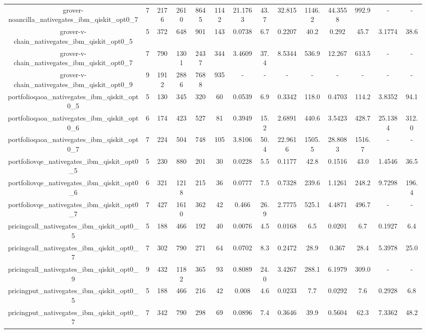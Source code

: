 \begin{table}[htb]
{\begin{tabular}{|c|c|c|c|c|c|c|c|c|c|c|c|c|c|}
grover-noancilla\_nativegates\_ibm\_qiskit\_opt0\_7 & 7 & 2176 & 2610 & 8645 & 1142 & 21.1763 & 43.7 & 32.815 & 1146.2 & 44.3558 & 992.9 & - & - \\ 
grover-v-chain\_nativegates\_ibm\_qiskit\_opt0\_5 & 5 & 372 & 648 & 901 & 143 & 0.0738 & 6.7 & 0.2207 & 40.2 & 0.292 & 45.7 & 3.1774 & 38.6 \\ 
grover-v-chain\_nativegates\_ibm\_qiskit\_opt0\_7 & 7 & 790 & 1301 & 2437 & 344 & 3.4609 & 37.4 & 8.5344 & 536.9 & 12.267 & 613.5 & - & - \\ 
grover-v-chain\_nativegates\_ibm\_qiskit\_opt0\_9 & 9 & 1912 & 2886 & 7688 & 935 & - & - & - & - & - & - & - & - \\ 
portfolioqaoa\_nativegates\_ibm\_qiskit\_opt0\_5 & 5 & 130 & 345 & 320 & 60 & 0.0539 & 6.9 & 0.3342 & 118.0 & 0.4703 & 114.2 & 3.8352 & 94.1 \\ 
portfolioqaoa\_nativegates\_ibm\_qiskit\_opt0\_6 & 6 & 174 & 423 & 527 & 81 & 0.3949 & 15.2 & 2.6891 & 440.6 & 3.5423 & 428.7 & 25.1384 & 312.0 \\ 
portfolioqaoa\_nativegates\_ibm\_qiskit\_opt0\_7 & 7 & 224 & 504 & 748 & 105 & 3.8106 & 50.4 & 22.9616 & 1505.5 & 28.8083 & 1516.7 & - & - \\ 
portfoliovqe\_nativegates\_ibm\_qiskit\_opt0\_5 & 5 & 230 & 880 & 201 & 30 & 0.0228 & 5.5 & 0.1177 & 42.8 & 0.1516 & 43.0 & 1.4546 & 36.5 \\ 
portfoliovqe\_nativegates\_ibm\_qiskit\_opt0\_6 & 6 & 321 & 1218 & 215 & 36 & 0.0777 & 7.5 & 0.7328 & 239.6 & 1.1261 & 248.2 & 9.7298 & 196.4 \\ 
portfoliovqe\_nativegates\_ibm\_qiskit\_opt0\_7 & 7 & 427 & 1610 & 362 & 42 & 0.466 & 26.9 & 2.7775 & 525.1 & 4.4871 & 496.7 & - & - \\ 
pricingcall\_nativegates\_ibm\_qiskit\_opt0\_5 & 5 & 188 & 466 & 192 & 40 & 0.0076 & 4.5 & 0.0168 & 6.5 & 0.0201 & 6.7 & 0.1927 & 6.4 \\ 
pricingcall\_nativegates\_ibm\_qiskit\_opt0\_7 & 7 & 302 & 790 & 271 & 64 & 0.0702 & 8.3 & 0.2472 & 28.9 & 0.367 & 28.4 & 5.3978 & 25.0 \\ 
pricingcall\_nativegates\_ibm\_qiskit\_opt0\_9 & 9 & 432 & 1182 & 365 & 93 & 0.8089 & 24.0 & 3.4267 & 288.1 & 6.1979 & 309.0 & - & - \\ 
pricingput\_nativegates\_ibm\_qiskit\_opt0\_5 & 5 & 188 & 466 & 216 & 42 & 0.008 & 4.6 & 0.0233 & 7.7 & 0.0292 & 7.6 & 0.2928 & 6.8 \\ 
pricingput\_nativegates\_ibm\_qiskit\_opt0\_7 & 7 & 342 & 790 & 298 & 69 & 0.0896 & 7.4 & 0.3646 & 39.9 & 0.5604 & 62.3 & 7.3362 & 48.2 \\ 

\end{tabular}}
\end{table}
